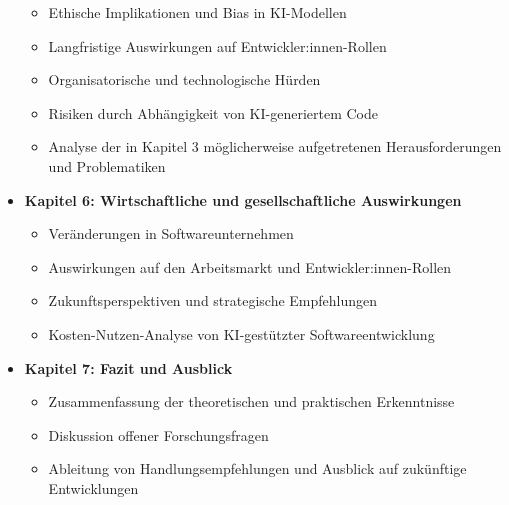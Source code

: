 \begin{itemize}
\begin{itemize}
            \item Ethische Implikationen und Bias in KI-Modellen
            \item Langfristige Auswirkungen auf Entwickler:innen-Rollen
            \item Organisatorische und technologische Hürden
            \item Risiken durch Abhängigkeit von KI-generiertem Code
            \item Analyse der in Kapitel 3 möglicherweise aufgetretenen Herausforderungen und Problematiken
        \end{itemize}
    \item \textbf{Kapitel 6: Wirtschaftliche und gesellschaftliche Auswirkungen} 
        \begin{itemize}
            \item Veränderungen in Softwareunternehmen
            \item Auswirkungen auf den Arbeitsmarkt und Entwickler:innen-Rollen
            \item Zukunftsperspektiven und strategische Empfehlungen
            \item Kosten-Nutzen-Analyse von KI-gestützter Softwareentwicklung
        \end{itemize}
    \item \textbf{Kapitel 7: Fazit und Ausblick} 
        \begin{itemize}
            \item Zusammenfassung der theoretischen und praktischen Erkenntnisse
            \item Diskussion offener Forschungsfragen
            \item Ableitung von Handlungsempfehlungen und Ausblick auf zukünftige Entwicklungen
        \end{itemize}
\end{itemize}